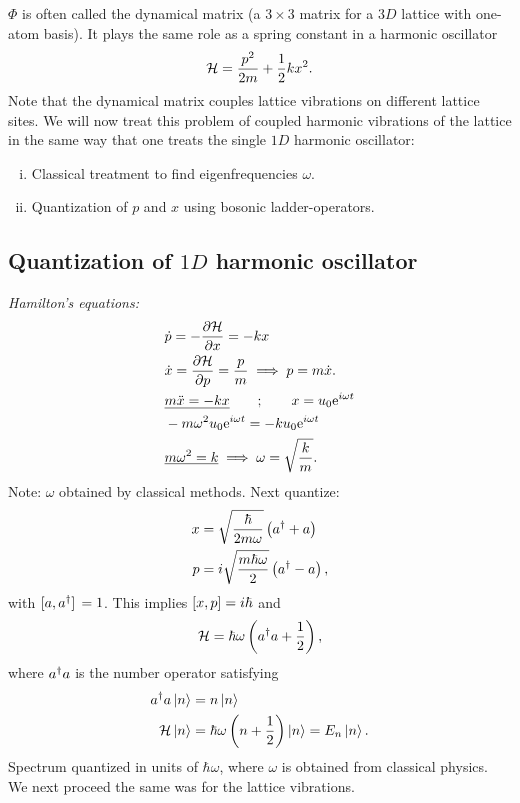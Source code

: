 $\Phi$ is often called the dynamical matrix (a $3\times3$ matrix for a $3D$ lattice with one-atom basis). It plays the same role as a spring constant in a harmonic oscillator
\begin{equation}
\mathcal{H} = \frac{p^2}{2m} + \frac{1}{2}kx^2.	
\end{equation}
Note that the dynamical matrix couples lattice vibrations on different lattice sites. We will now treat this problem of coupled harmonic vibrations of the lattice in the same way that one treats the single $1D$ harmonic oscillator:
\begin{enumerate}[i)]
	\item Classical treatment to find eigenfrequencies $\omega$.
	\item Quantization of $p$ and $x$ using bosonic ladder-operators.
\end{enumerate}
\subsection{Quantization of $1D$ harmonic oscillator}
\emph{Hamilton's equations:}
\begin{align}
	&\dot{p}  = -\pdv{\mathcal{H}}{x} = -kx \\
	&\dot{x} = \pdv{\mathcal{H}}{p} = \frac{p}{m} \implies p = m\dot{x}. \\
	&\emph{m\ddot{x} = -kx} \qquad ;\qquad x = u_0\mathrm{e}^{i\omega t} \\
	&-m\omega^2 u_0\mathrm{e}^{i\omega t} = -k u_0 \mathrm{e}^{i\omega t} \\
	&\emph{m\omega^2=k}\implies \omega = \sqrt{\frac{k}{m}}.
\end{align}
Note: $\omega$ obtained by classical methods. Next quantize:
\begin{align}
	x &= \sqrt{\frac{\hbar}{2m\omega}}\left (a^{\dagger} + a\right ) \\
	p &= i\sqrt{\frac{m\hbar\omega}{2}}\left (a^{\dagger} - a\right ),
\end{align}
with $\comm*{a}{a^{\dg}} = 1$. This implies $\comm{x}{p} = i\hbar$ and
\begin{equation}
	\mathcal{H} = \hbar\omega\left (a^{\dagger}a + \frac{1}{2}\right ),
\end{equation}
where $a^{\dagger}a$ is the number operator satisfying
\begin{align}
	a^{\dagger}a\ket{n} &= n\ket{n} \\
	\mathcal{H}\ket{n} &= \hbar\omega\left (n + \frac{1}{2}\right )\ket{n} = E_n\ket{n}.
\end{align}
Spectrum quantized in units of $\hbar\omega$, where $\omega$ is obtained from classical physics. 
We next proceed the same was for the lattice vibrations. 

